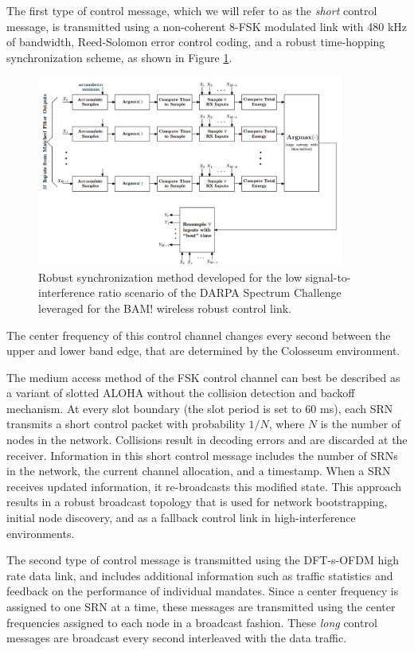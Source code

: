 \documentclass[11pt]{article}
\begin{document}
\begin{enumerate}
     The first type of control message, which we will refer to as the \emph{short} control message, is transmitted using a non-coherent 8-FSK modulated link with 480 kHz of bandwidth, Reed-Solomon error control coding, and a robust time-hopping synchronization scheme, as shown in Figure \ref{fg:NDASync}.
     \begin{figure} [htb]
     \centerline{
     \includegraphics[width = 0.9\textwidth]{Figures/NDASync.png}}
     \caption{Robust synchronization method developed for the low signal-to-interference ratio scenario of the DARPA Spectrum Challenge leveraged for the BAM! wireless robust control link.}
     \label{fg:NDASync}
     \end{figure}
     The center frequency of this control channel changes every second between the upper and lower band edge, that are determined by the Colosseum environment.
     
     The medium access method of the FSK control channel can best be described as a variant of slotted ALOHA without the collision detection and backoff mechanism. At every slot boundary (the slot period is set to 60 ms), each SRN transmits a short control packet with probability $1/N$, where $N$ is the number of nodes in the network. Collisions result in decoding errors and are discarded at the receiver. Information in this short control message includes the number of SRNs in the network, the current channel allocation, and a timestamp. When a SRN receives updated information, it re-broadcasts this modified state. This approach results in a robust broadcast topology that is used for network bootstrapping, initial node discovery, and as a fallback control link in high-interference environments.

     The second type of control message is transmitted using the DFT-s-OFDM high rate data link, and includes additional information such as traffic statistics and feedback on the performance of individual mandates. Since a center frequency is assigned to one SRN at a time, these messages are transmitted using the center frequencies assigned to each node in a broadcast fashion. These \emph{long} control messages are broadcast every second interleaved with the data traffic.
     

\end{enumerate}
\end{document}
